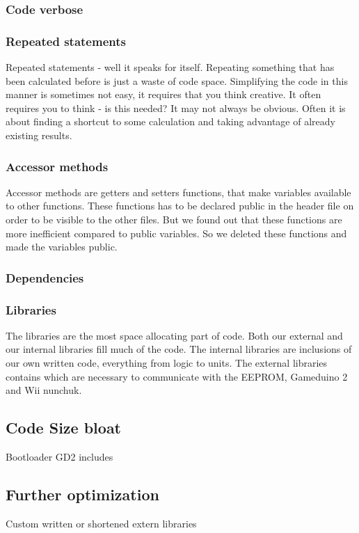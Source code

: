 \subsubsection{Code verbose}
\subsubsection{Repeated statements }
Repeated statements - well it speaks for itself. Repeating something that has been calculated
before is just a waste of code space. Simplifying the code in this manner is sometimes
not easy, it requires that you think creative. It often requires you to think - is this
needed? It may not always be obvious. Often it is about finding a shortcut to some
calculation and taking advantage of already existing results.

\subsubsection{Accessor methods}
Accessor methods are getters and setters functions, that make
variables available to other functions. These functions has to
be declared public in the header file on order to be visible to the
other files. But we found out that these functions are more inefficient
compared to public variables. So we deleted these functions
and made the variables public.

\subsubsection{Dependencies}

\subsubsection{Libraries}
The libraries are the most space allocating part of code. Both our external and
our internal libraries fill much of the code. The internal libraries are
inclusions of our own written code, everything from logic to units. The external
libraries contains which are necessary to communicate with the EEPROM,
Gameduino 2 and Wii nunchuk.



\subsection{Code Size bloat} Bootloader GD2 includes \subsection{Further
optimization} Custom written or shortened extern libraries

